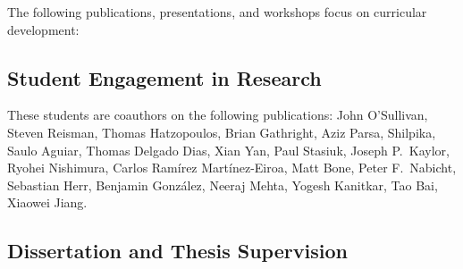 The following publications, presentations, and workshops focus on curricular development:

\begin{refsection}
\nocite{Scala_2019}
\nocite{CDERBook}
\nocite{ScalaDays_2017}
\nocite{wl_honig_framework_2015}
\nocite{mark_lewis_scala_2014}
\nocite{mark_lewis_using_2013}
\nocite{EduPar2012}
\nocite{EduPar2011}
\nocite{2003_AOSD}
\nocite{chung2003}
\nocite{Triveni_OOPSLAEDU_1998}
\nocite{Laufer_MCC_1997}
\printbibliography[heading=none,sorting=ynt]
\end{refsection}
   

\subsection{Student Engagement in Research}

These students are coauthors on the following publications:
John O’Sullivan,
Steven Reisman, 
Thomas Hatzopoulos, 
Brian Gathright, 
Aziz Parsa,
Shilpika, 
Saulo Aguiar,
Thomas Delgado Dias, 
Xian Yan,
Paul Stasiuk,
Joseph P.\ Kaylor,
Ryohei Nishimura, 
Carlos Ramírez Martínez-Eiroa,
Matt Bone, 
Peter F.\ Nabicht,
Sebastian Herr,
Benjamin González,
Neeraj Mehta, 
Yogesh Kanitkar,
Tao Bai,
Xiaowei Jiang.

\begin{refsection}
\nocite{Scala_2019}
\nocite{doi:10.4137/EBO.S32757}
\nocite{WSSSPE_2015}
\nocite{GCASR_2015}
\nocite{GCASR_2015}
\nocite{gcasr_2013_environmental_data}
\nocite{gcasr_2013_tablets}
\nocite{kaylor_simplifying_2012}
\nocite{CloudBookRestFS}
\nocite{kaylor_restfs_2011}
\nocite{DBLP:conf/icsoft/2011-2}
\nocite{george_k_thiruvathukal_virtualization_2010}
\nocite{kaylor_online_2010}
\nocite{k_laufer_putting_2009}
\nocite{DBLP:conf/seke/HerrLSTW08}
\nocite{matt_bone_taming_2008}
\nocite{IPDPS_2007}
\nocite{konstantin_laufer_hike_2007}
\nocite{chung2003}
\nocite{DBLP:conf/cp/GuptaJJJL00}
\printbibliography[heading=none,sorting=ynt]
\end{refsection}


\subsection{Dissertation and Thesis Supervision}


